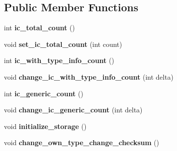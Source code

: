 \subsection*{Public Member Functions}
\begin{DoxyCompactItemize}
\item 
int {\bfseries ic\+\_\+total\+\_\+count} ()\hypertarget{classv8_1_1internal_1_1_type_feedback_info_aac28d6c8f9d02337ed4d52ba4d92b5b2}{}\label{classv8_1_1internal_1_1_type_feedback_info_aac28d6c8f9d02337ed4d52ba4d92b5b2}

\item 
void {\bfseries set\+\_\+ic\+\_\+total\+\_\+count} (int count)\hypertarget{classv8_1_1internal_1_1_type_feedback_info_a709b68f591d63296511358f959a3a6a2}{}\label{classv8_1_1internal_1_1_type_feedback_info_a709b68f591d63296511358f959a3a6a2}

\item 
int {\bfseries ic\+\_\+with\+\_\+type\+\_\+info\+\_\+count} ()\hypertarget{classv8_1_1internal_1_1_type_feedback_info_af3be8c479fc63db7572e066d4dff504d}{}\label{classv8_1_1internal_1_1_type_feedback_info_af3be8c479fc63db7572e066d4dff504d}

\item 
void {\bfseries change\+\_\+ic\+\_\+with\+\_\+type\+\_\+info\+\_\+count} (int delta)\hypertarget{classv8_1_1internal_1_1_type_feedback_info_aa97b72eaecbddff03b505441b533bfce}{}\label{classv8_1_1internal_1_1_type_feedback_info_aa97b72eaecbddff03b505441b533bfce}

\item 
int {\bfseries ic\+\_\+generic\+\_\+count} ()\hypertarget{classv8_1_1internal_1_1_type_feedback_info_a6fa8a6e885ce7889f1c9d38b92901b09}{}\label{classv8_1_1internal_1_1_type_feedback_info_a6fa8a6e885ce7889f1c9d38b92901b09}

\item 
void {\bfseries change\+\_\+ic\+\_\+generic\+\_\+count} (int delta)\hypertarget{classv8_1_1internal_1_1_type_feedback_info_a6e1fbc7ad7122ba0079844977e1fb242}{}\label{classv8_1_1internal_1_1_type_feedback_info_a6e1fbc7ad7122ba0079844977e1fb242}

\item 
void {\bfseries initialize\+\_\+storage} ()\hypertarget{classv8_1_1internal_1_1_type_feedback_info_a8e606a54549bc6f0488d991c2e366d9e}{}\label{classv8_1_1internal_1_1_type_feedback_info_a8e606a54549bc6f0488d991c2e366d9e}

\item 
void {\bfseries change\+\_\+own\+\_\+type\+\_\+change\+\_\+checksum} ()\hypertarget{classv8_1_1internal_1_1_type_feedback_info_a43b977b2fbf51222543e47581e4d7a6f}{}\label{classv8_1_1internal_1_1_type_feedback_info_a43b977b2fbf51222543e47581e4d7a6f}


\end{DoxyCompactItemize}
